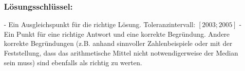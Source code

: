 \begin{langesbeispiel}
{\begin{enumerate}
\subsubsection{Lösungsschlüssel:}

- Ein Ausgleichspunkt für die richtige Lösung.
Toleranzintervall: $[2003; 2005]$
- Ein Punkt für eine richtige Antwort und eine korrekte Begründung. Andere korrekte Begründungen
(z.B. anhand sinnvoller Zahlenbeispiele oder mit der Feststellung, dass das arithmetische
Mittel nicht notwendigerweise der Median sein muss) sind ebenfalls als richtig zu
werten.

\end{enumerate}
}

		
\end{langesbeispiel}